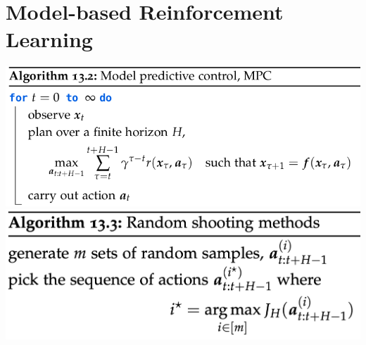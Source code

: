\section{Model-based Reinforcement Learning}

\includegraphics[width=0.9\linewidth,trim={0 0 1cm 0}]{images/MPC.png}
\includegraphics[width=0.9\linewidth,trim={0 0 1cm 0}]{images/random_shooting.png}
